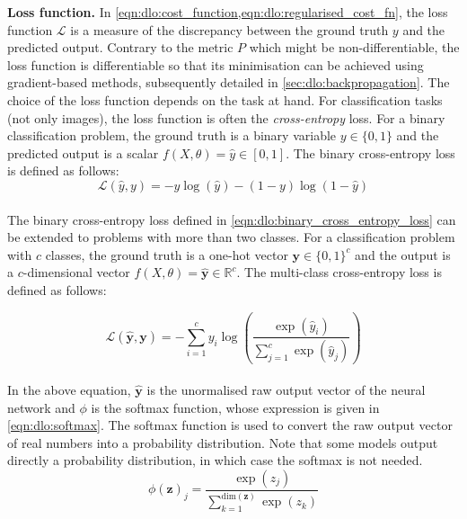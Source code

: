 \noindent\textbf{Loss function.} In
\cref{eqn:dlo:cost_function,eqn:dlo:regularised_cost_fn}, the loss function
$\mathcal{L}$ is a measure of the discrepancy between the ground truth $y$ and
the predicted output. Contrary to the metric $P$ which might be
non-differentiable, the loss function is differentiable so that its minimisation
can be achieved using gradient-based methods, subsequently detailed in
\cref{sec:dlo:backpropagation}. The choice of the loss function depends on the
task at hand. For classification tasks (not only images), the loss function is
often the \emph{cross-entropy} loss. For a binary classification problem, the
ground truth is a binary variable $y\in \{0,1\}$ and the predicted output is a
scalar $f(X,\theta)=\hat{y}\in[0,1]$. The binary cross-entropy loss is defined
as follows:\\

\begin{equation}
  \label{eqn:dlo:binary_cross_entropy_loss}
  \mathcal{L}(\hat{y}, y) = - y \log(\hat{y}) - (1-y) \log(1-\hat{y})
\end{equation}\\

\noindent The binary cross-entropy loss defined in
\cref{eqn:dlo:binary_cross_entropy_loss} can be extended to problems with more
than two classes. For a classification problem with $c$ classes, the ground
truth is a one-hot vector $\mathbf{y}\in \{0,1\}^c$ and the output is a
$c$-dimensional vector $f(X,\theta)=\hat{\mathbf{y}}\in\mathds{R}^c$. The
multi-class cross-entropy loss is defined as follows:

\begin{equation}
  \label{eqn:dlo:multiclass_cross_entropy_loss}
  \mathcal{L}(\hat{\mathbf{y}}, \mathbf{y}) = - \sum_{i=1}^c y_i \log \left( \displaystyle\frac{\exp(\hat{y}_i)}{\displaystyle\sum_{j=1}^c \exp(\hat{y}_j)} \right)
\end{equation}\\

\noindent In the above equation, $\hat{\mathbf{y}}$ is the unormalised raw
output vector of the neural network and $\phi$ is the softmax function, whose
expression is given in \cref{eqn:dlo:softmax}. The softmax function is used to
convert the raw output vector of real numbers into a probability distribution.
Note that some models output directly a probability distribution, in which case
the softmax is not needed.\\

\begin{equation}
  \label{eqn:dlo:softmax}
  \phi(\mathbf{z})_j = \frac{\exp(z_j)}{\displaystyle\sum_{k=1}^{\text{dim}(\mathbf{z})} \exp(z_k)}
\end{equation}\\

